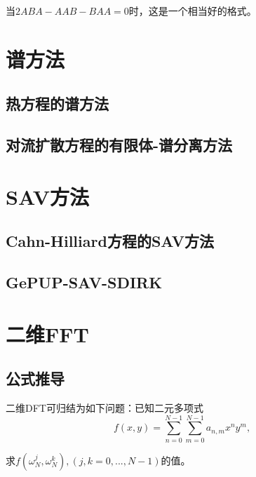\documentclass[lang=cn,10pt,bibend=bibtex]{elegantbook}
\begin{document}
当$2ABA-AAB-BAA=0$时，这是一个相当好的格式。

\vspace{5em}

\chapter{谱方法}

\section{热方程的谱方法}

\section{对流扩散方程的有限体-谱分离方法}

\chapter{SAV方法}

\section{Cahn-Hilliard方程的SAV方法}

\section{GePUP-SAV-SDIRK}

\printbibliography[heading=bibintoc,title=\ebibname]

\appendix

\chapter{二维FFT}

\section{公式推导}

\begin{lemma}
    二维DFT可归结为如下问题：已知二元多项式
    \begin{equation*}
        f(x,y)=\sum_{n=0}^{N-1}\sum_{m=0}^{N-1} a_{n,m}x^ny^m,
    \end{equation*}

    求$f(\omega_N^j,\omega_N^k),(j,k=0,...,N-1)$的值。
\end{lemma}
\end{document}
